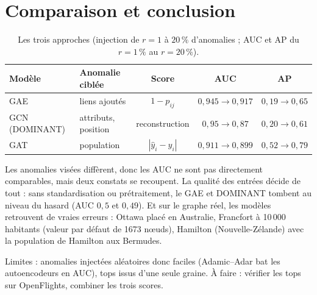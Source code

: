 \section{Comparaison et conclusion}
\label{sec:concl}

\begin{table}[!ht]
\centering
\footnotesize
\caption{Les trois approches (injection de $r=1$ à $20\,\%$ d'anomalies ; AUC et AP du $r=1\,\%$ au $r=20\,\%$).}
\label{tab:comp}
\setlength{\tabcolsep}{3pt}
\begin{tabular}{@{}llccc@{}}
\toprule
Modèle & Anomalie ciblée & Score & AUC & AP \\
\midrule
GAE & liens ajoutés & $1-p_{ij}$ & $0{,}945\to0{,}917$ & $0{,}19\to0{,}65$ \\
GCN (DOMINANT) & attributs, position & reconstruction & $0{,}95\to0{,}87$ & $0{,}20\to0{,}61$ \\
GAT & population & $|\hat y_i-y_i|$ & $0{,}911\to0{,}899$ & $0{,}52\to0{,}79$ \\
\bottomrule
\end{tabular}
\end{table}

Les anomalies visées diffèrent, donc les AUC ne sont pas directement comparables, mais deux constats se recoupent. La qualité des entrées décide de tout : sans standardisation ou prétraitement, le GAE et DOMINANT tombent au niveau du hasard (AUC $0{,}5$ et $0{,}49$). Et sur le graphe réel, les modèles retrouvent de vraies erreurs : Ottawa placé en Australie, Francfort à 10\,000 habitants (valeur par défaut de 1673 nœuds), Hamilton (Nouvelle-Zélande) avec la population de Hamilton aux Bermudes.

Limites : anomalies injectées aléatoires donc faciles (Adamic--Adar bat les autoencodeurs en AUC), tops issus d'une seule graine. À faire : vérifier les tops sur OpenFlights, combiner les trois scores.
